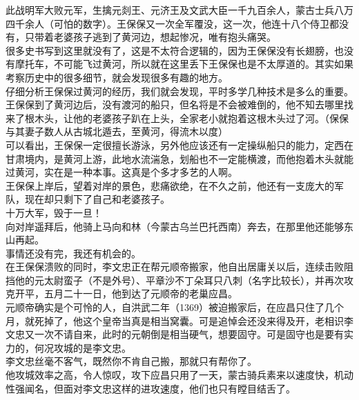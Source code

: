 \begin{multicols}{\theparacolNo}
此战明军大败元军，生擒元剡王、元济王及文武大臣一千九百余人，蒙古士兵八万四千余人（可怕的数字）。王保保又一次全军覆没，这一次，他连十八个侍卫都没有，只带着老婆孩子逃到了黄河边，想起惨况，唯有抱头痛哭。\\

很多史书写到这里就没有了，这是不太符合逻辑的，因为王保保没有长翅膀，也没有摩托车，不可能飞过黄河，所以就在这里丢下王保保也是不太厚道的。其实如果考察历史中的很多细节，就会发现很多有趣的地方。\\

仔细分析王保保过黄河的经历，我们就会发现，平时多学几种技术是多么的重要。\\

王保保到了黄河边后，没有渡河的船只，但名将是不会被难倒的，他不知去哪里找来了根木头，让他的老婆孩子趴在上头，全家老小就抱着这根木头过了河。（保保与其妻子数人从古城北遁去，至黄河，得流木以度）\\

可以看出，王保保一定很擅长游泳，另外他应该还有一定操纵船只的能力，定西在甘肃境内，是黄河上游，此地水流湍急，划船也不一定能横渡，而他抱着木头就能过黄河，实在是一种本事。这真是个多才多艺的人啊。\\

王保保上岸后，望着对岸的景色，悲痛欲绝，在不久之前，他还有一支庞大的军队，现在却只剩下了自己和老婆孩子。\\

十万大军，毁于一旦！\\

向对岸遥拜后，他骑上马向和林（今蒙古乌兰巴托西南）奔去，在那里他还能够东山再起。\\

事情还没有完，我还有机会的。\\

在王保保溃败的同时，李文忠正在帮元顺帝搬家，他自出居庸关以后，连续击败阻挡他的元太尉蛮子（不是外号）、平章沙不丁朵耳只八刺（名字比较长），并再次攻克开平，五月二十一日，他到达了元顺帝的老巢应昌。\\

元顺帝确实是个可怜的人，自洪武二年（1369）被迫搬家后，在应昌只住了几个月，就死掉了，他这个皇帝当真是相当窝囊。可是追悼会还没来得及开，老相识李文忠又一次不请自来，此时的元朝倒是相当硬气，想要固守。可是固守也是要有实力的，何况攻城的是李文忠。\\

李文忠丝毫不客气，既然你不肯自己搬，那就只有帮你了。\\

他攻城效率之高，令人惊叹，攻下应昌只用了一天，蒙古骑兵素来以速度快，机动性强闻名，但面对李文忠这样的进攻速度，他们也只有瞠目结舌了。\\


\end{multicols}
